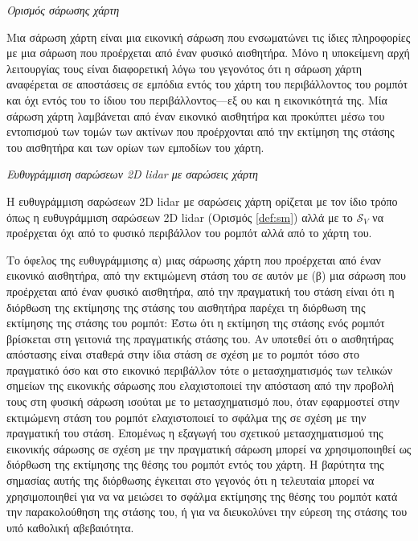 \begin{bw_box}
\begin{definition}
\label{def:map_scan}
\textit{Ορισμός σάρωσης χάρτη}

Μια σάρωση χάρτη είναι μια εικονική σάρωση που ενσωματώνει τις ίδιες
πληροφορίες με μια σάρωση που προέρχεται από έναν φυσικό αισθητήρα. Μόνο η
υποκείμενη αρχή λειτουργίας τους είναι διαφορετική λόγω του γεγονότος ότι η
σάρωση χάρτη αναφέρεται σε αποστάσεις σε εμπόδια εντός του χάρτη του
περιβάλλοντος του ρομπότ και όχι εντός του το ίδιου του περιβάλλοντος---εξ ου
και η εικονικότητά της. Μία σάρωση χάρτη λαμβάνεται από έναν εικονικό
αισθητήρα και προκύπτει μέσω του εντοπισμού των τομών των ακτίνων που
προέρχονται από την εκτίμηση της στάσης του αισθητήρα και των ορίων των
εμποδίων του χάρτη.
\end{definition}
\end{bw_box}

\begin{bw_box}
\begin{definition}
\label{def:smsm}
\textit{Ευθυγράμμιση σαρώσεων 2D lidar με σαρώσεις χάρτη}

Η ευθυγράμμιση σαρώσεων 2D lidar με σαρώσεις χάρτη ορίζεται με τον ίδιο τρόπο
όπως η ευθυγράμμιση σαρώσεων 2D lidar (Ορισμός \ref{def:sm}) αλλά με το
$\mathcal{S}_V$ να προέρχεται όχι από το φυσικό περιβάλλον του ρομπότ αλλά
από το χάρτη του.
\end{definition}
\end{bw_box}


\begin{gg_box}
\begin{remark}
\label{remark:smsm_benefit}
Το όφελος της ευθυγράμμισης α) μιας σάρωσης χάρτη που προέρχεται από έναν
εικονικό αισθητήρα, από την εκτιμώμενη στάση του σε αυτόν με (β) μια σάρωση
που προέρχεται από έναν φυσικό αισθητήρα, από την πραγματική του στάση είναι
ότι η διόρθωση της εκτίμησης της στάσης του αισθητήρα παρέχει τη διόρθωση της
εκτίμησης της στάσης του ρομπότ: Έστω ότι η εκτίμηση της στάσης ενός ρομπότ
βρίσκεται στη γειτονιά της πραγματικής στάσης του. Αν υποτεθεί ότι ο
αισθητήρας απόστασης είναι σταθερά στην ίδια στάση σε σχέση με το ρομπότ τόσο
στο πραγματικό όσο και στο εικονικό περιβάλλον τότε ο μετασχηματισμός των
τελικών σημείων της εικονικής σάρωσης που ελαχιστοποιεί την απόσταση από την
προβολή τους στη φυσική σάρωση ισούται με το μετασχηματισμό που, όταν
εφαρμοστεί στην εκτιμώμενη στάση του ρομπότ ελαχιστοποιεί το σφάλμα της σε
σχέση με την πραγματική του στάση. Επομένως η εξαγωγή του σχετικού
μετασχηματισμού της εικονικής σάρωσης σε σχέση με την πραγματική σάρωση
μπορεί να χρησιμοποιηθεί ως διόρθωση της εκτίμησης της θέσης του ρομπότ εντός
του χάρτη. Η βαρύτητα της σημασίας αυτής της διόρθωσης έγκειται στο γεγονός
ότι η τελευταία μπορεί να χρησιμοποιηθεί για να να μειώσει το σφάλμα
εκτίμησης της θέσης του ρομπότ κατά την παρακολούθηση της στάσης του, ή για
να διευκολύνει την εύρεση της στάσης του υπό καθολική αβεβαιότητα.
\end{remark}
\end{gg_box}


